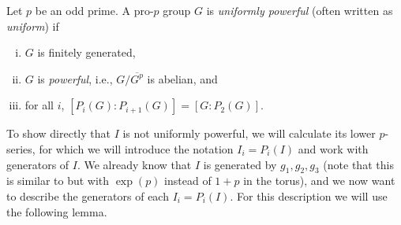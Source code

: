 \begin{definition}
  Let $p$ be an odd prime. A pro-$p$ group $G$ is \emph{uniformly powerful} (often written as \emph{uniform}) if
  \begin{enumerate}[(i)]
    \item $G$ is finitely generated,
    \item $G$ is \emph{powerful}, i.e., $G/\overline{G^{p}}$ is abelian, and
    \item for all $i$, $[P_{i}(G) : P_{i+1}(G)] = [G : P_{2}(G)]$.
  \end{enumerate}
\end{definition}

To show directly that $I$ is not uniformly powerful, we will calculate its lower $p$-series, for which we will introduce the notation $I_{i} = P_{i}(I)$ and work with generators of $I$. We already know that $I$ is generated by $g_{1},g_{2},g_{3}$ (note that this is similar to \cite[Thm.~2.4.1]{Generators} but with $\exp(p)$ instead of $1+p$ in the torus), and we now want to describe the generators of each $I_{i} = P_{i}(I)$. For this description we will use the following lemma.

